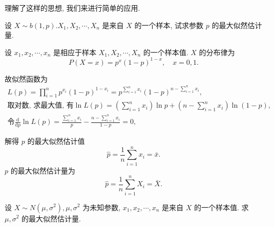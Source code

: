 理解了这样的思想, 我们来进行简单的应用. 

\begin{example}
    设 $X \sim b(1, p) . X_1, X_2, \cdots, X_n$ 是来自 $X$ 的一个样本, 试求参数 $p$ 的最大似然估计量.
\end{example}

\begin{solution}
    设 $x_1, x_2, \cdots, x_n$ 是相应于样本 $X_1, X_2, \cdots, X_n$ 的一个样本值. $X$ 的分布律为
$$
P(X=x)=p^x(1-p)^{1-x}, \quad x=0,1 .
$$

故似然函数为
$$
\begin{gathered}
L(p)=\prod_{i=1}^n p^{x_i}(1-p)^{1-x_i}=p^{\sum_{i=1}^n x_i}(1-p)^{n-\sum_{i=1}^n x_i}, \\
\text{取对数, 求最大值, 有}\ln L(p)=\left(\sum_{i=1}^n x_i\right) \ln p+\left(n-\sum_{i=1}^n x_i\right) \ln (1-p), \\
\text{令}\frac{\mathrm{d}}{\mathrm{d} p} \ln L(p)=\frac{\sum_{i=1}^n x_i}{p}-\frac{n-\sum_{i=1}^n x_i}{1-p}=0,
\end{gathered}
$$

解得 $p$ 的最大似然估计值
$$
\hat{p}=\frac{1}{n} \sum_{i=1}^n x_i=\bar{x} .
$$
$p$ 的最大似然估计量为
$$
\hat{p}=\frac{1}{n} \sum_{i=1}^n X_i=\bar{X} .
$$
\end{solution}

\begin{example}
    \label{ex:normal}
    设 $X \sim N\left(\mu, \sigma^2\right), \mu, \sigma^2$ 为未知参数, $x_1, x_2, \cdots, x_n$ 是来自 $X$ 的一个样本值. 求 $\mu, \sigma^2$ 的最大似然估计量.
\end{example}


